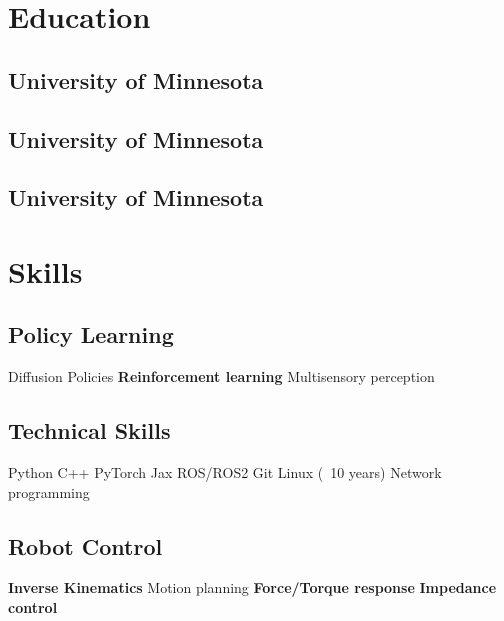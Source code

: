 \documentclass[]{deedy-resume-reversed}
\renewcommand{\sectionsep}{\vspace{1.0em}}
\begin{document}
\begin{minipage}[t]{0.33\textwidth}


\section{Education}

\subsection{University of Minnesota}
\sectionsep

\subsection{University of Minnesota}
\sectionsep

\subsection{University of Minnesota}
\sectionsep


\section{Skills}
\subsection{Policy Learning}
Diffusion Policies \textbullet{} \textbf{Reinforcement learning} \textbullet{} Multisensory perception
\sectionsep

\subsection{Technical Skills}
Python \textbullet{} C++ \textbullet{} PyTorch \textbullet{} Jax \textbullet{}  ROS/ROS2 \textbullet{} Git \textbullet{} Linux (~10 years) \textbullet{} Network programming 
\sectionsep

\subsection{Robot Control}
\textbf{Inverse Kinematics} \textbullet{} Motion planning \textbullet{} \textbf{Force/Torque response} \textbullet{} \textbf{Impedance control} 
\sectionsep


\end{minipage}
\end{document}
